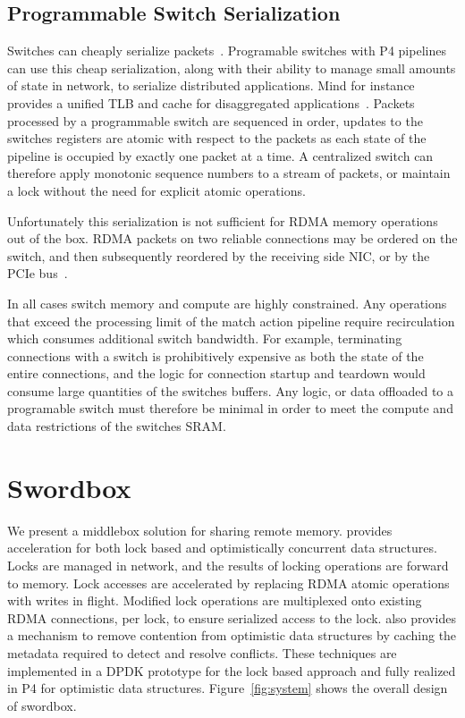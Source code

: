 \subsection{Programmable Switch Serialization}

Switches can cheaply serialize packets~\cite{when-computer}.
Programable switches with P4 pipelines can use this cheap
serialization, along with their ability to manage small
amounts of state in network, to serialize distributed
applications. Mind for instance provides a unified TLB and
cache for disaggregated applications~\cite{mind}. Packets
processed by a programmable switch are sequenced in order,
updates to the switches registers are atomic with respect to
the packets as each state of the pipeline is occupied by
exactly one packet at a time. A centralized switch can
therefore apply monotonic sequence numbers to a stream of
packets, or maintain a lock without the need for explicit
atomic operations.

Unfortunately this serialization is not sufficient for RDMA
memory operations out of the box. RDMA packets on two
reliable connections may be ordered on the switch, and then
subsequently reordered by the receiving side NIC, or by the
PCIe bus~\cite{understanding-pcie}.

In all cases switch memory and compute are highly
constrained. Any operations that exceed the processing
limit of the match action pipeline require recirculation
which consumes additional switch bandwidth. For example,
terminating connections with a switch is prohibitively
expensive as both the state of the entire connections, and
the logic for connection startup and teardown would consume
large quantities of the switches buffers. Any logic, or data
offloaded to a programable switch must therefore be minimal
in order to meet the compute and data restrictions of the
switches SRAM.

\section{Swordbox}

We present \sword a middlebox solution for sharing remote
memory. \sword provides acceleration for both lock based and
optimistically concurrent data structures. Locks are managed
in network, and the results of locking operations are
forward to memory. Lock accesses are accelerated by
replacing RDMA atomic operations with writes in flight.
Modified lock operations are multiplexed onto existing RDMA
connections, per lock, to ensure serialized access to the
lock. \sword also provides a mechanism to remove contention
from optimistic data structures by caching the metadata
required to detect and resolve conflicts. These techniques
are implemented in a DPDK prototype for the lock based
approach and fully realized in P4 for optimistic data
structures. Figure~\ref{fig:system} shows the overall design
of swordbox.


